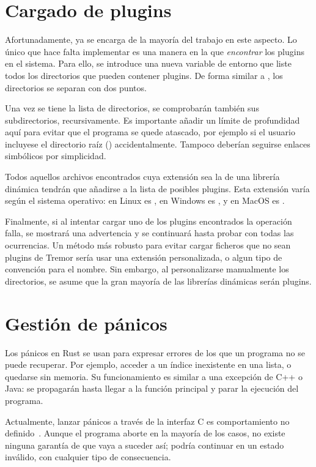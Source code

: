 \section{Cargado de plugins}

Afortunadamente, \abistable ya se encarga de la mayoría del trabajo en este
aspecto. Lo único que hace falta implementar es una manera en la que
\emph{encontrar} los plugins en el sistema. Para ello, se introduce una nueva
variable de entorno  que liste todos los directorios
que pueden contener plugins. De forma similar a , los directorios se
separan con dos puntos.

Una vez se tiene la lista de directorios, se comprobarán también sus
subdirectorios, recursivamente. Es importante añadir un límite de profundidad
aquí para evitar que el programa se quede atascado, por ejemplo si el usuario
incluyese el directorio raíz (\code{/}) accidentalmente. Tampoco deberían
seguirse enlaces simbólicos por simplicidad.

Todos aquellos archivos encontrados cuya extensión sea la de una librería
dinámica tendrán que añadirse a la lista de posibles plugins. Esta extensión
varía según el sistema operativo: en Linux es , en Windows es
, y en MacOS es .

Finalmente, si al intentar cargar uno de los plugins encontrados la operación
falla, se mostrará una advertencia y se continuará hasta probar con todas las
ocurrencias. Un método más robusto para evitar cargar ficheros que no sean
plugins de Tremor sería usar una extensión personalizada, o algun tipo de
convención para el nombre. Sin embargo, al personalizarse manualmente los
directorios, se asume que la gran mayoría de las librerías dinámicas serán
plugins.

\section{Gestión de pánicos}

Los pánicos en Rust se usan para expresar errores de los que un programa no se
puede recuperar. Por ejemplo, acceder a un índice inexistente en una lista, o
quedarse sin memoria. Su funcionamiento es similar a una excepción de C++ o
Java: se propagarán hasta llegar a la función principal y parar la ejecución del
programa.

Actualmente, lanzar pánicos a través de la interfaz C es comportamiento no
definido~\cite[FFI and Panics]{nomicon}. Aunque el programa aborte en la mayoría
de los casos, no existe ninguna garantía de que vaya a suceder así; podría
continuar en un estado inválido, con cualquier tipo de consecuencia.

